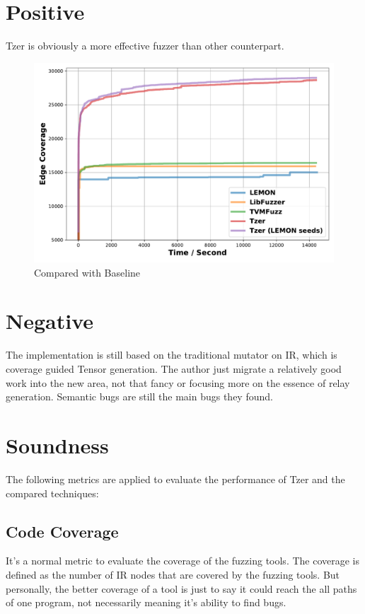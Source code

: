 \documentclass[conference]{IEEEtran}
\begin{document}
\section{Positive}
Tzer is obviously a more effective fuzzer than other counterpart.
\begin{figure}[htbp]
    \centering
    \includegraphics[width=\columnwidth]{./baseline_cov.pdf}
    \caption{Compared with Baseline}
  \end{figure}
  
\section{Negative}
The implementation is still based on the traditional mutator on IR, which is coverage guided Tensor generation. The author just migrate a relatively good work into the new area, not that fancy or focusing more on the essence of relay generation. Semantic bugs are still the main bugs they found.

\section{Soundness}
The following metrics are applied to evaluate the performance of Tzer and the compared techniques:
\subsection{Code Coverage} It's a normal metric to evaluate the coverage of the fuzzing tools. The coverage is defined as the number of IR nodes that are covered by the fuzzing tools. But personally, the better coverage of a tool is just to say it could reach the all paths of one program, not necessarily meaning it's ability to find bugs.
\end{document}
